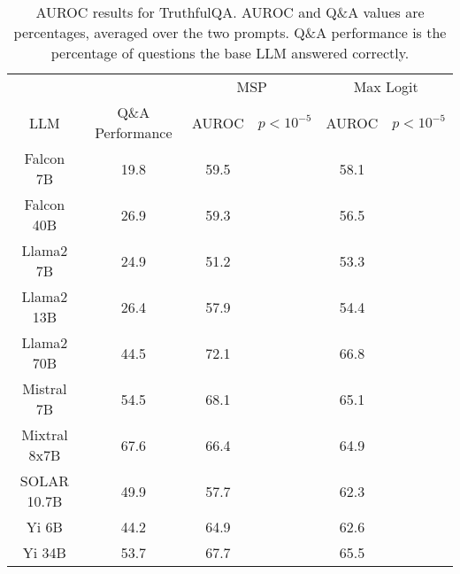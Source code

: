 \begin{table*}
\centering
\begin{tabular}{c|c|c|c|c|c}
& & \multicolumn{2}{c|}{MSP} & \multicolumn{2}{c}{Max Logit} \\ 
LLM & Q\&A Performance & AUROC & $p < 10^{-5}$ & AUROC & $p < 10^{-5}$\\ \hline
Falcon 7B & 19.8 & 59.5 &  & 58.1 & \\
Falcon 40B & 26.9 & 59.3 &  & 56.5 & \\
Llama2 7B & 24.9 & 51.2 &  & 53.3 & \\
Llama2 13B & 26.4 & 57.9 &  & 54.4 & \\
Llama2 70B & 44.5 & 72.1 &  & 66.8 & \\
Mistral 7B & 54.5 & 68.1 &  & 65.1 & \\
Mixtral 8x7B & 67.6 & 66.4 &  & 64.9 & \\
SOLAR 10.7B & 49.9 & 57.7 &  & 62.3 & \\
Yi 6B & 44.2 & 64.9 &  & 62.6 & \\
Yi 34B & 53.7 & 67.7 &  & 65.5 & \\
\hline
\end{tabular}
\caption{AUROC results for TruthfulQA. AUROC and Q\&A values are percentages, averaged over the two prompts. Q\&A performance is the percentage of questions the base LLM answered correctly.}
\label{tab:truthfulqa_auroc}
\end{table*}
